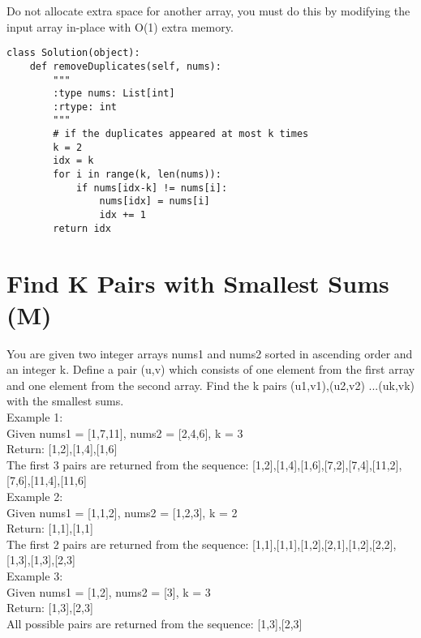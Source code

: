 Do not allocate extra space for another array, you must do this by modifying the input array in-place with O(1) extra memory.\\

\begin{lstlisting}
class Solution(object):
    def removeDuplicates(self, nums):
        """
        :type nums: List[int]
        :rtype: int
        """
        # if the duplicates appeared at most k times
        k = 2
        idx = k
        for i in range(k, len(nums)):
            if nums[idx-k] != nums[i]:
                nums[idx] = nums[i]
                idx += 1
        return idx
\end{lstlisting}

\section{Find K Pairs with Smallest Sums (M)}
You are given two integer arrays nums1 and nums2 sorted in ascending order and an integer k. Define a pair (u,v) which consists of one element from the first array and one element from the second array. Find the k pairs (u1,v1),(u2,v2) ...(uk,vk) with the smallest sums.\\

Example 1:\\
Given nums1 = [1,7,11], nums2 = [2,4,6],  k = 3\\
Return: [1,2],[1,4],[1,6]\\
The first 3 pairs are returned from the sequence:
[1,2],[1,4],[1,6],[7,2],[7,4],[11,2],[7,6],[11,4],[11,6]\\

Example 2:\\
Given nums1 = [1,1,2], nums2 = [1,2,3],  k = 2\\
Return: [1,1],[1,1]\\
The first 2 pairs are returned from the sequence:
[1,1],[1,1],[1,2],[2,1],[1,2],[2,2],[1,3],[1,3],[2,3]\\

Example 3:\\
Given nums1 = [1,2], nums2 = [3],  k = 3 \\
Return: [1,3],[2,3]\\
All possible pairs are returned from the sequence:
[1,3],[2,3]\\

